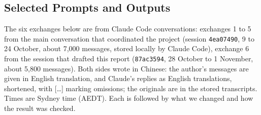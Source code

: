 \subsection{Selected Prompts and Outputs}

The six exchanges below are from Claude Code conversations: exchanges 1 to 5 from the main conversation that coordinated the project (session \texttt{4ea07490}, 9 to 24 October, about 7,000 messages, stored locally by Claude Code), exchange 6 from the session that drafted this report (\texttt{87ac3594}, 28 October to 1 November, about 5,800 messages). Both sides wrote in Chinese: the author's messages are given in English translation, and Claude's replies as English translations, shortened, with [\ldots] marking omissions; the originals are in the stored transcripts. Times are Sydney time (AEDT). Each is followed by what we changed and how the result was checked.

\newcommand{\who}[1]{\par\noindent\textbf{#1}\quad}
\newenvironment{exchange}[1]{\needspace{8\baselineskip}\subsubsection*{#1}\small}{\par}

